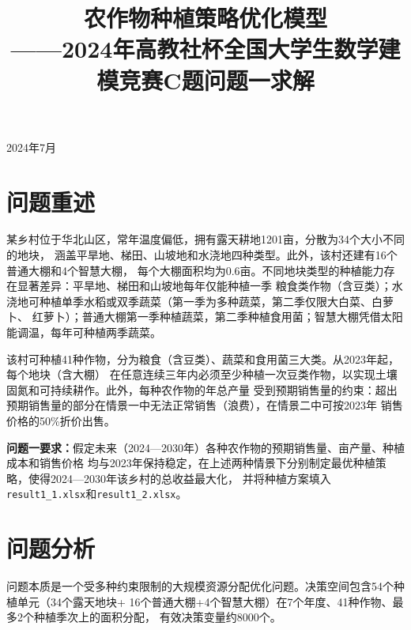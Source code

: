 \documentclass[12pt,a4paper]{ctexart}
\title{\vspace{2cm}\heiti\zihao{2} 农作物种植策略优化模型\\[0.5cm]
       \vspace{0.5cm}\songti\zihao{3} ——2024年高教社杯全国大学生数学建模竞赛C题问题一求解}
\author{}
\date{}
\begin{document}
\maketitle
\thispagestyle{empty}
\vspace{2cm}
\begin{center}
    \large\songti 2024年7月
\end{center}
\newpage

\setcounter{page}{1}
\tableofcontents
\newpage

\section{问题重述}

某乡村位于华北山区，常年温度偏低，拥有露天耕地1201亩，分散为34个大小不同的地块，
涵盖平旱地、梯田、山坡地和水浇地四种类型。此外，该村还建有16个普通大棚和4个智慧大棚，
每个大棚面积均为0.6亩。不同地块类型的种植能力存在显著差异：平旱地、梯田和山坡地每年仅能种植一季
粮食类作物（含豆类）；水浇地可种植单季水稻或双季蔬菜（第一季为多种蔬菜，第二季仅限大白菜、白萝卜、
红萝卜）；普通大棚第一季种植蔬菜，第二季种植食用菌；智慧大棚凭借太阳能调温，每年可种植两季蔬菜。

该村可种植41种作物，分为粮食（含豆类）、蔬菜和食用菌三大类。从2023年起，每个地块（含大棚）
在任意连续三年内必须至少种植一次豆类作物，以实现土壤固氮和可持续耕作。此外，每种农作物的年总产量
受到预期销售量的约束：超出预期销售量的部分在情景一中无法正常销售（浪费），在情景二中可按2023年
销售价格的50\%折价出售。

\textbf{问题一要求：}假定未来（2024—2030年）各种农作物的预期销售量、亩产量、种植成本和销售价格
均与2023年保持稳定，在上述两种情景下分别制定最优种植策略，使得2024—2030年该乡村的总收益最大化，
并将种植方案填入\texttt{result1\_1.xlsx}和\texttt{result1\_2.xlsx}。

\section{问题分析}

问题本质是一个受多种约束限制的大规模资源分配优化问题。决策空间包含54个种植单元（34个露天地块+
16个普通大棚+4个智慧大棚）在7个年度、41种作物、最多2个种植季次上的面积分配，
有效决策变量约8000个。
\end{document}
